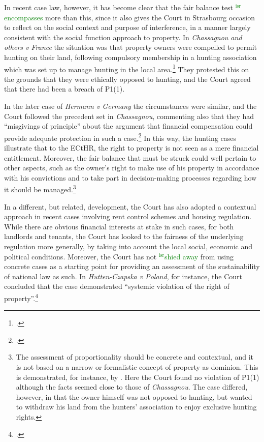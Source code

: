 \documentclass[12pt,a4paper]{book} %
\newcommand{\isr}[1]{\textcolor{green}{$^{\textrm{isr}}${#1}}}
\begin{document}
In recent case law, however, it has become clear that the fair balance test \isr{encompasses} more than this, since it also gives the Court in Strasbourg occasion to reflect on the social context and purpose of interference, in a manner largely consistent with the social function approach to property. In {\it Chassagnou and others v France} the situation was that property owners were compelled to permit hunting on their land, following compulsory membership in a hunting association which was set up to manage hunting in the local area.\footcite{chassagnou99} They protested this on the grounds that they were ethically opposed to hunting, and the Court agreed that there had been a breach of P1(1). 

In the later case of {\it Hermann v Germany} the circumstances were similar, and the Court followed the precedent set in {\it Chassagnou}, commenting also that they had ``misgivings of principle'' about the argument that financial compensation could provide adequate protection in such a case.\footcite[See][91]{hermann12}  In this way, the hunting cases illustrate that to the ECtHR, the right to property is not seen as a mere financial entitlement. Moreover, the fair balance that must be struck could well pertain to other aspects, such as the owner's right to make use of his property in accordance with his convictions and to take part in decision-making processes regarding how it should be managed.\footnote{The assessment of proportionality should be concrete and contextual, and it is not based on a narrow or formalistic concept of property as dominion. This is demonstrated, for instance, by \cite{chabauty12}. Here the Court found no violation of P1(1) although the facts seemed close to those of {\it Chassagnou}. The case differed, however, in that the owner himself was not opposed to hunting, but wanted to withdraw his land from the hunters' association to enjoy exclusive hunting rights.}

In a different, but related, development, the Court has also adopted a contextual approach in recent cases involving rent control 
schemes and housing regulation. While there are obvious financial interests at stake in such cases, for both landlords and tenants, the Court has looked to the fairness of the underlying regulation more generally, by taking into account the local social, economic and political conditions. Moreover, the Court has not \isr{shied away} from using concrete cases as a starting point for providing an assessment of the sustainability of national law as such. In {\it Hutten-Czapska v Poland}, for instance, the Court concluded that the case demonstrated ``systemic violation of the right of property''.\footcite[239]{hutten06}
\end{document}
